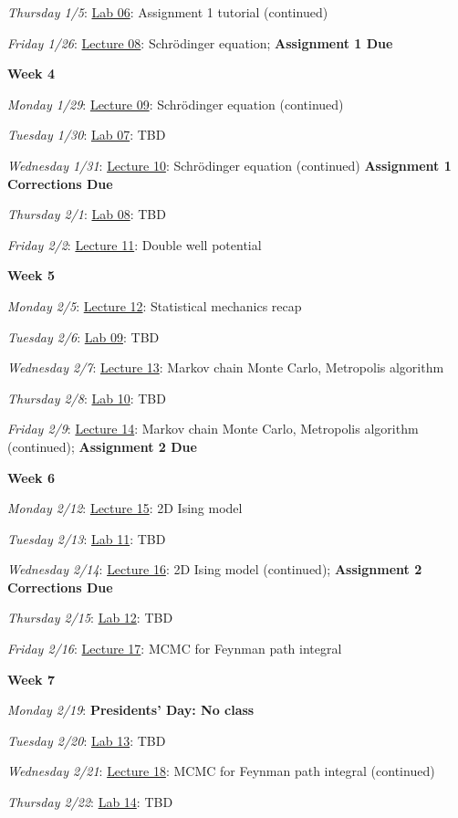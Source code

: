 \documentclass[12pt]{article}
\begin{document}
\emph{Thursday 1/5}: \underline{Lab 06}: Assignment 1 tutorial (continued)

\emph{Friday 1/26}: \underline{Lecture 08}: Schr\"{o}dinger equation; \textbf{Assignment 1 Due}

\noindent\textbf{Week 4}

\emph{Monday 1/29}: \underline{Lecture 09}: Schr\"{o}dinger equation (continued)

\emph{Tuesday 1/30}: \underline{Lab 07}: TBD

\emph{Wednesday 1/31}: \underline{Lecture 10}: Schr\"{o}dinger equation (continued) \textbf{Assignment 1 Corrections Due}

\emph{Thursday 2/1}: \underline{Lab 08}: TBD

\emph{Friday 2/2}: \underline{Lecture 11}: Double well potential

\noindent\textbf{Week 5}

\emph{Monday 2/5}: \underline{Lecture 12}: Statistical mechanics recap

\emph{Tuesday 2/6}: \underline{Lab 09}: TBD

\emph{Wednesday 2/7}: \underline{Lecture 13}: Markov chain Monte Carlo, Metropolis algorithm

\emph{Thursday 2/8}: \underline{Lab 10}: TBD

\emph{Friday 2/9}: \underline{Lecture 14}: Markov chain Monte Carlo, Metropolis algorithm (continued); \textbf{Assignment 2 Due}

\noindent\textbf{Week 6}

\emph{Monday 2/12}: \underline{Lecture 15}: 2D Ising model

\emph{Tuesday 2/13}: \underline{Lab 11}: TBD

\emph{Wednesday 2/14}: \underline{Lecture 16}: 2D Ising model (continued); \textbf{Assignment 2 Corrections Due}

\emph{Thursday 2/15}: \underline{Lab 12}: TBD

\emph{Friday 2/16}: \underline{Lecture 17}: MCMC for Feynman path integral

\noindent\textbf{Week 7}

\emph{Monday 2/19}: \textbf{Presidents' Day: No class}

\emph{Tuesday 2/20}: \underline{Lab 13}: TBD

\emph{Wednesday 2/21}: \underline{Lecture 18}: MCMC for Feynman path integral (continued)

\emph{Thursday 2/22}: \underline{Lab 14}: TBD
\end{document}
